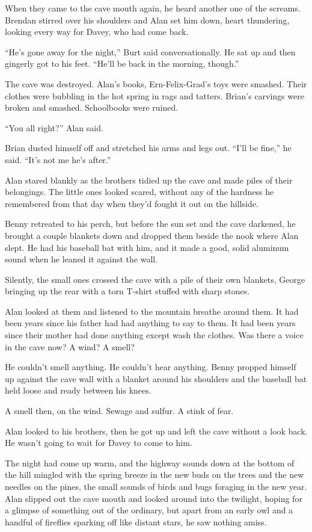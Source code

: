 \documentclass{article}
\begin{document}
When they came to the cave mouth again, he heard another one of the
screams.  Brendan stirred over his shoulders and Alan set him down,
heart thundering, looking every way for Davey, who had come back.

``He's gone away for the night,'' Burt said conversationally.  He sat
up and then gingerly got to his feet.  ``He'll be back in the morning,
though.''

The cave was destroyed.  Alan's books, Ern-Felix-Grad's toys were
smashed.  Their clothes were bubbling in the hot spring in rags and
tatters.  Brian's carvings were broken and smashed.  Schoolbooks were
ruined.

``You all right?'' Alan said.

Brian dusted himself off and stretched his arms and legs out.  ``I'll
be fine,'' he said.  ``It's not me he's after.''

Alan stared blankly as the brothers tidied up the cave and made piles
of their belongings.  The little ones looked scared, without any of
the hardness he remembered from that day when they'd fought it out on
the hillside.

Benny retreated to his perch, but before the sun set and the cave
darkened, he brought a couple blankets down and dropped them beside
the nook where Alan slept.  He had his baseball bat with him, and it
made a good, solid aluminum sound when he leaned it against the wall.

Silently, the small ones crossed the cave with a pile of their own
blankets, George bringing up the rear with a torn T-shirt stuffed with
sharp stones.

Alan looked at them and listened to the mountain breathe around them. 
It had been years since his father had had anything to say to them. 
It had been years since their mother had done anything except wash the
clothes.  Was there a voice in the cave now?  A wind?  A smell?

He couldn't smell anything.  He couldn't hear anything.  Benny propped
himself up against the cave wall with a blanket around his shoulders
and the baseball bat held loose and ready between his knees.

A smell then, on the wind.  Sewage and sulfur.  A stink of fear.

Alan looked to his brothers, then he got up and left the cave without
a look back.  He wasn't going to wait for Davey to come to him.

The night had come up warm, and the highway sounds down at the bottom
of the hill mingled with the spring breeze in the new buds on the
trees and the new needles on the pines, the small sounds of birds and
bugs foraging in the new year.  Alan slipped out the cave mouth and
looked around into the twilight, hoping for a glimpse of something out
of the ordinary, but apart from an early owl and a handful of
fireflies sparking off like distant stars, he saw nothing amiss.
\end{document}
